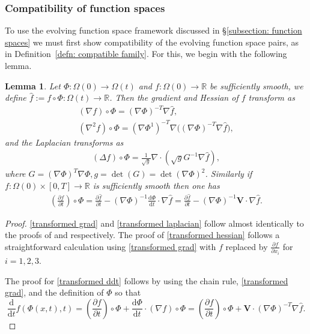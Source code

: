 \documentclass[a4paper]{amsart}
\numberwithin{equation}{section}
\newcommand{\ddt}[1]{\frac{\partial #1}{\partial t}}
\newcommand{\grad}{\nabla}
\newcommand{\Div}{\nabla \cdot}
\theoremstyle{plain}
\newtheorem{lemma}[theorem]{Lemma}
\newcommand{\mbf}[1]{\mathbf{#1}}
\newcommand{\mbb}[1]{\mathbb{#1}}
\begin{document}
\subsubsection{Compatibility of function spaces}
To use the evolving function space framework discussed in \S\ref{subsection: function spaces} we must first show compatibility of the evolving function space pairs, as in Definition~\ref{defn: compatible family}.
For this, we begin with the following lemma.
\begin{lemma}
	\label{transformation lemma}
	Let $\Phi: \Omega(0) \rightarrow \Omega(t)$ and $f: \Omega(0) \rightarrow \mbb{R}$ be sufficiently smooth, we define $\widehat{f} := f \circ \Phi : \Omega(t) \rightarrow \mbb{R}$.
	Then the gradient and Hessian of $f$ transform as
	\begin{gather}
		(\grad f) \circ \Phi = (\grad \Phi)^{-T} \grad \widehat{f},\label{transformed grad}\\
		(\grad^2 f) \circ \Phi = (\grad \Phi^1)^{-T} \grad \big((\grad \Phi)^{-T} \grad \widehat{f}\big) \label{transformed hessian},
	\end{gather}
	and the Laplacian transforms as
	\begin{align}
		(\Delta f) \circ \Phi = \frac{1}{\sqrt{g}} \Div (\sqrt{g} G^{-1} \grad \widehat{f}), \label{transformed laplacian}
	\end{align}
	where $G = (\grad \Phi)^T \grad \Phi, g = \det(G) = \det(\grad \Phi)^2$.
	Similarly if $f:\Omega(0) \times [0,T] \rightarrow \mbb{R}$ is sufficiently smooth then one has
	\begin{align}
		\left( \ddt{f}\right) \circ \Phi = \ddt{\widehat{f}} - (\grad \Phi)^{-1} \frac{\mathrm{d} \Phi}{\mathrm{d}t} \cdot \grad \widehat{f} = \ddt{\widehat{f}} - (\grad \Phi)^{-1} \mbf{V} \cdot \grad \widehat{f}.\label{transformed ddt}
	\end{align}
\end{lemma}
\begin{proof}
	\eqref{transformed grad} and \eqref{transformed laplacian} follow almost identically to the proofs of \cite[Lemma 3.3]{church2020domain} and \cite[Lemma 3.4]{church2020domain} respectively.
	The proof of \eqref{transformed hessian} follows a straightforward calculation using \eqref{transformed grad} with $f$ replaced by $\frac{\partial f}{\partial x_i}$ for $i= 1,2,3$.
	
	The proof for \eqref{transformed ddt} follows by using the chain rule, \eqref{transformed grad}, and the definition of $\Phi$ so that
	\[ \frac{\mathrm{d}}{\mathrm{d}t} f(\Phi(x,t),t) = \left( \ddt{f} \right) \circ \Phi + \frac{\mathrm{d} \Phi}{\mathrm{d}t} \cdot(\grad {f}) \circ \Phi = \left( \ddt{f} \right) \circ \Phi + \mbf{V} \cdot (\grad \Phi)^{-T} \grad \widehat{f}. \]
\end{proof}
\end{document}
